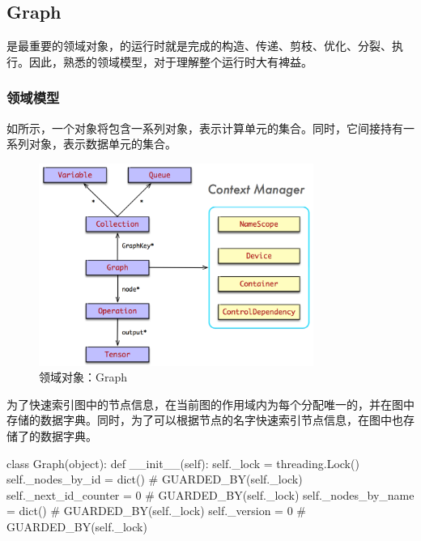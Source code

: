 \begin{content}
\subsection{Graph}

是\tf{}最重要的领域对象，\tf{}的运行时就是完成的构造、传递、剪枝、优化、分裂、执行。因此，熟悉的领域模型，对于理解整个\tf{}运行时大有裨益。

\subsubsection{领域模型}

如所示，一个对象将包含一系列对象，表示计算单元的集合。同时，它间接持有一系列对象，表示数据单元的集合。

\begin{figure}[H]
\centering
\includegraphics[width=0.8\textwidth]{figures/py-graph.png}
\caption{领域对象：Graph}
 \label{fig:py-graph}
\end{figure}

为了快速索引图中的节点信息，在当前图的作用域内为每个分配唯一的，并在图中存储的数据字典。同时，为了可以根据节点的名字快速索引节点信息，在图中也存储了的数据字典。

\begin{leftbar}
\begin{python}
class Graph(object):
  def __init__(self):
    self._lock = threading.Lock()
    self._nodes_by_id = dict()    # GUARDED\_BY(self.\_lock)
    self._next_id_counter = 0     # GUARDED\_BY(self.\_lock)
    self._nodes_by_name = dict()  # GUARDED\_BY(self.\_lock)
    self._version = 0             # GUARDED\_BY(self.\_lock)
\end{python}
\end{leftbar}


\end{content}
